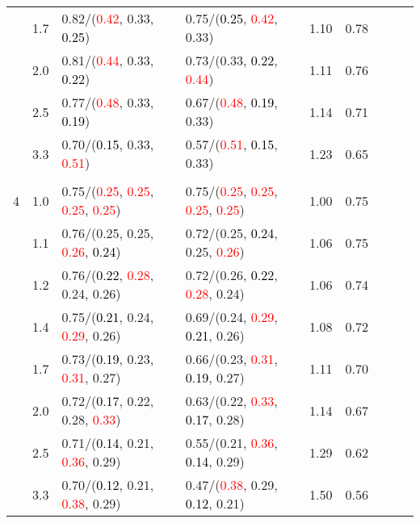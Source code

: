 \documentclass[10pt,a4paper]{report}
\begin{document}
\begin{table}[!htbp]
\begin{center}
{\begin{tabular}{ccllccccc}
			&1.7&0.82/(\textcolor{red}{0.42}, 0.33, \textcolor{black}{0.25})&0.75/(\textcolor{black}{0.25}, \textcolor{red}{0.42}, 0.33)&1.10&0.78\\
			&2.0&0.81/(\textcolor{red}{0.44}, 0.33, \textcolor{black}{0.22})&0.73/(0.33, \textcolor{black}{0.22}, \textcolor{red}{0.44})&1.11&0.76\\
			&2.5&0.77/(\textcolor{red}{0.48}, 0.33, \textcolor{black}{0.19})&0.67/(\textcolor{red}{0.48}, \textcolor{black}{0.19}, 0.33)&1.14&0.71\\
			&3.3&0.70/(\textcolor{black}{0.15}, 0.33, \textcolor{red}{0.51})&0.57/(\textcolor{red}{0.51}, \textcolor{black}{0.15}, 0.33)&1.23&0.65\\
			&&&&\\
			4			&1.0&0.75/(\textcolor{red}{0.25}, \textcolor{red}{0.25}, \textcolor{red}{0.25}, \textcolor{red}{0.25})&0.75/(\textcolor{red}{0.25}, \textcolor{red}{0.25}, \textcolor{red}{0.25}, \textcolor{red}{0.25})&1.00&0.75\\
			&1.1&0.76/(0.25, 0.25, \textcolor{red}{0.26}, \textcolor{black}{0.24})&0.72/(0.25, \textcolor{black}{0.24}, 0.25, \textcolor{red}{0.26})&1.06&0.75\\
			&1.2&0.76/(\textcolor{black}{0.22}, \textcolor{red}{0.28}, 0.24, 0.26)&0.72/(0.26, \textcolor{black}{0.22}, \textcolor{red}{0.28}, 0.24)&1.06&0.74\\
			&1.4&0.75/(\textcolor{black}{0.21}, 0.24, \textcolor{red}{0.29}, 0.26)&0.69/(0.24, \textcolor{red}{0.29}, \textcolor{black}{0.21}, 0.26)&1.08&0.72\\
			&1.7&0.73/(\textcolor{black}{0.19}, 0.23, \textcolor{red}{0.31}, 0.27)&0.66/(0.23, \textcolor{red}{0.31}, \textcolor{black}{0.19}, 0.27)&1.11&0.70\\
			&2.0&0.72/(\textcolor{black}{0.17}, 0.22, 0.28, \textcolor{red}{0.33})&0.63/(0.22, \textcolor{red}{0.33}, \textcolor{black}{0.17}, 0.28)&1.14&0.67\\
			&2.5&0.71/(\textcolor{black}{0.14}, 0.21, \textcolor{red}{0.36}, 0.29)&0.55/(0.21, \textcolor{red}{0.36}, \textcolor{black}{0.14}, 0.29)&1.29&0.62\\
			&3.3&0.70/(\textcolor{black}{0.12}, 0.21, \textcolor{red}{0.38}, 0.29)&0.47/(\textcolor{red}{0.38}, 0.29, \textcolor{black}{0.12}, 0.21)&1.50&0.56\\
			\bottomrule
		\end{tabular}}
	\end{center}
\end{table}
\end{document}
